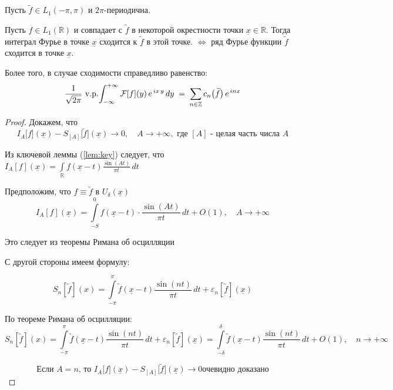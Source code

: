 \begin{theorem}
    Пусть \( \tilde{f} \in L_1(-\pi, \pi) \) и \(2\pi\)-периодична.

    Пусть \( f \in L_1(\mathbb{R}) \) и совпадает с \( \widetilde{f} \) в некоторой окрестности точки \( \underline{x} \in \mathbb{R} \). Тогда интеграл Фурье в точке \(\underline{x}\) сходится к \(\widetilde{f}\) в этой точке. \(\Leftrightarrow\) ряд Фурье функции \(\widetilde{f}\) сходится в точке \(\underline{x}\).

    Более того, в случае сходимости справедливо равенство:
\[
\frac{1}{\sqrt{2\pi}}\,\mathop{\mathrm{v.p.}}\!\int
_{-\infty}^{+\infty}
\mathcal{F}[f](y)\,e^{\,i x\,y}\,dy
\;=\;
\sum_{n\in\mathbb{Z}}
c_{n}\bigl(\widetilde{f}\bigr)\,e^{\,i n x}
\]
\end{theorem}


\begin{proof}

Докажем, что
\[
I_A \bigl[f\bigr](\underline{x}) - S_{[A]}\bigl[\widetilde{f}\bigr](\underline{x}) \longrightarrow 0, \quad A \to +\infty, \text{ где $[A]$ - целая часть числа $A$}
\]

Из ключевой леммы (\ref{lem:key}) следует, что $I_A[f](\underline{x}) = \int\limits_{\mathbb{R}} f(\underline{x} - t) \frac{\sin(At)}{\pi t} \, dt$

Предположим, что $f \equiv \widetilde{f}
    \text{ в } U_\delta(\underline{x})$
\[
I_A \left[ f \right](\underline{x}) = \int\limits_{-S}^{0} f(\underline{x} - t) \cdot \frac{\sin(At)}{\pi t} \, dt + O(1), \quad A \to +\infty
\]

Это следует из теоремы Римана об осцилляции %


С другой стороны имеем формулу: %


\[
S_n \left[\widetilde{f}\right](x) = \int\limits_{-\pi}^{\pi} \widetilde{f}(\underline{x} - t) \frac{\sin(nt)}{\pi t} \, dt + \varepsilon_n \left[\widetilde{f}\right](\underline{x})
\]

По теореме Римана об осцилляции: %
\[
S_n \left[\widetilde{f}\right](x) = \int\limits_{-\pi}^{\pi} \widetilde{f}(\underline{x} - t) \frac{\sin(nt)}{\pi t} \, dt + \varepsilon_n \left[\widetilde{f}\right](\underline{x}) = \int\limits_{-\delta}^{\delta} \widetilde{f}(\underline{x} - t) \frac{\sin(nt)}{\pi t} \, dt + O(1), \quad n \rightarrow +\infty
\]


\[
\text{Если $A = n$, то }I_A \bigl[f\bigr](\underline{x}) - S_{[A]}\bigl[\widetilde{f}\bigr](\underline{x}) \longrightarrow 0 \text{
очевидно доказано}
\]


\end{proof}
